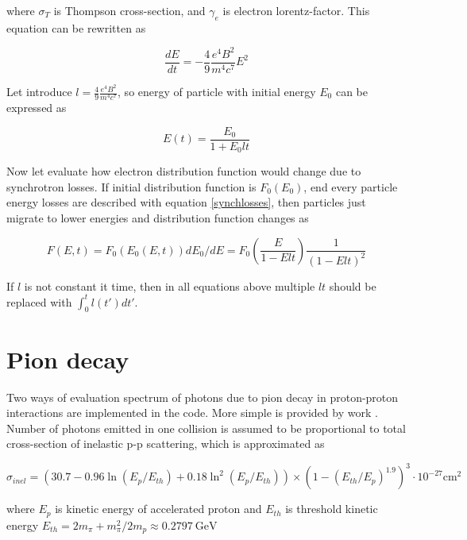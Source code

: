 where $\sigma_T$ is Thompson cross-section, and $\gamma_e$ is electron lorentz-factor. This equation can be rewritten as

\begin{equation} \label{synchlosses}
	\frac{dE}{dt} = - \frac{4}{9} \frac{e^4 B^2}{m^4 c^7} E^2
\end{equation}

Let introduce $l = \frac{4}{9} \frac{e^4 B^2}{m^4 c^7}$, so energy of particle with initial energy $E_0$ can be expressed as

\begin{equation}
	E(t) = \frac{E_0}{1 + E_0 l t}
\end{equation}

Now let evaluate how electron distribution function would change due to synchrotron losses. If initial distribution function is $F_0(E_0)$, end every particle energy losses are described with equation \ref{synchlosses}, then particles just migrate to lower energies and distribution function changes as

\begin{equation}
	F(E,t) = F_0\left(E_0(E,t)\right) dE_0/dE = F_0\left(\frac{E}{1-E l t}\right)\frac{1}{\left(1 - E l t\right)^2}
\end{equation}

If $l$ is not constant it time, then in all equations above multiple $l t$ should be replaced with $\int_0^t l(t')dt'$.

\section{Pion decay}\label{PionFormulaeSection}

Two ways of evaluation spectrum of photons due to pion decay in proton-proton interactions are implemented in the code. More simple is provided by work \cite{Kelner}. Number of photons emitted in one collision is assumed to be proportional to total cross-section of inelastic p-p scattering, which is approximated as \cite{Kafexhiu}

\begin{equation}\label{sigmainel}
	\sigma_{inel} = \left(30.7 - 0.96\ln\left(E_p/E_{th}\right) + 0.18\ln^2\left(E_p/E_{th}\right) \right)\times\left(1 - \left(E_{th}/E_p\right)^{1.9}\right)^3\cdot10^{-27} \text{cm}^{2}
\end{equation}

where $E_p$ is kinetic energy of accelerated proton and $E_{th}$ is threshold kinetic energy $E_{th} = 2m_{\pi}+m^2_{\pi}/2m_p \approx 0.2797~\text{GeV}$

